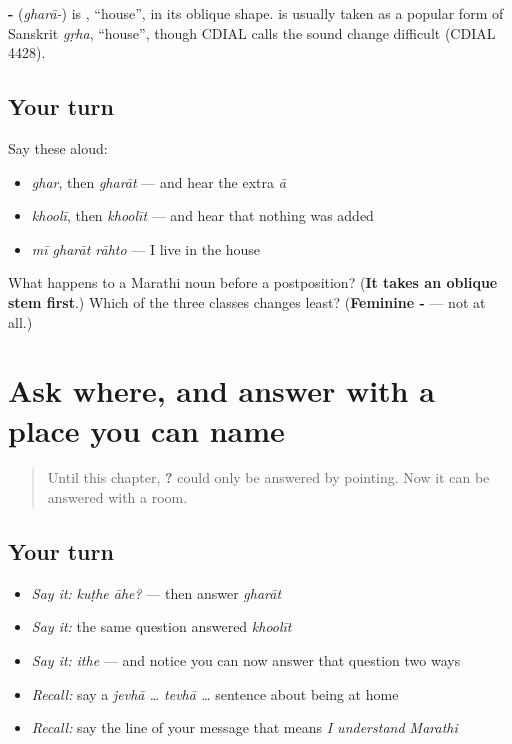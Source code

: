 \begin{cousinweb}
\textbf{-} (\emph{gharā-}) is \textbf{}, \textquotedblleft{}house\textquotedblright{}, in its oblique shape. \textbf{} is usually taken as a popular form of Sanskrit \emph{gṛha}, \textquotedblleft{}house\textquotedblright{}, though CDIAL calls the sound change difficult (CDIAL 4428).
\end{cousinweb}

\subsection*{Your turn}
Say these aloud:

\begin{itemize}
\raggedright
  \item \emph{ghar}, then \emph{gharāt} — and hear the extra \emph{ā}
  \item \emph{khoolī}, then \emph{khoolīt} — and hear that nothing was added
  \item \emph{mī gharāt rāhto} — I live in the house
\end{itemize}

\begin{tcolorbox}[breakable,colback=teal!4,colframe=teal!35!black,title={Before you move on}]
What happens to a Marathi noun before a postposition? (\textbf{It takes an oblique stem first}.) Which of the three classes changes least? (\textbf{Feminine -} — not at all.)
\end{tcolorbox}
\section[\texorpdfstring{\mr{घरात} · \mr{खोलीत} (gharāt · khoolīt)}{घरात · खोलीत (gharāt · khoolīt)}]{Ask where, and answer with a place you can name}

\label{lesson:MR-R41-in-the-house}



\begin{quote}
Until this chapter, \textbf{?} could only be answered by pointing. Now it can be answered with a room.
\end{quote}

\subsection*{Your turn}
\begin{itemize}
\raggedright
  \item \emph{Say it:} \emph{kuṭhe āhe?} — then answer \emph{gharāt}
  \item \emph{Say it:} the same question answered \emph{khoolīt}
  \item \emph{Say it:} \emph{ithe} — and notice you can now answer that question two ways
  \item \emph{Recall:} say a \emph{jevhā … tevhā …} sentence about being at home
  \item \emph{Recall:} say the line of your message that means \emph{I understand Marathi}
\end{itemize}

